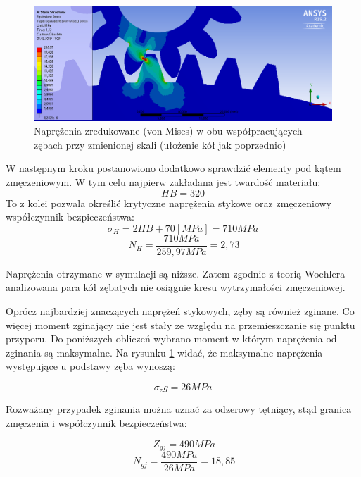 \begin{figure}[t]
	\centering
	\includegraphics[width=0.9\linewidth]{Obliczenia/von_mises_stress_przeszkalowany_przekladnia}
	\caption{Naprężenia zredukowane (von Mises) w obu współpracujących zębach przy zmienionej skali (ułożenie kół jak poprzednio)} 
	\label{fig::stress_von_mises_przeskalowany_przekladnia}
\end{figure}

W następnym kroku postanowiono dodatkowo sprawdzić elementy pod kątem zmęczeniowym.
W tym celu najpierw zakładana jest twardość materiału:
\begin{equation}
HB=320
\end{equation} 
To z kolei pozwala określić krytyczne naprężenia stykowe oraz zmęczeniowy współczynnik bezpieczeństwa:
\begin{equation}
\sigma_H = 2HB+70 [MPa]= 710MPa
\end{equation}
\begin{equation}
\ N_H=\frac{710 MPa}{259,97 MPa}=2,73
\end{equation} 

Naprężenia otrzymane w symulacji są niższe.
Zatem zgodnie z teorią Woehlera analizowana para kół zębatych nie osiągnie kresu wytrzymałości zmęczeniowej.

Oprócz najbardziej znaczących naprężeń stykowych, zęby są również zginane.
Co więcej moment zginający nie jest stały ze względu na przemieszczanie się punktu przyporu.
Do poniższych obliczeń wybrano moment w którym naprężenia od zginania są maksymalne.
Na rysunku \ref{fig::stress_von_mises_przeskalowany_przekladnia} widać, że maksymalne naprężenia występujące u podstawy zęba wynoszą:

\begin{equation}
\sigma_zg =26MPa
\end{equation}

Rozważany przypadek zginania można uznać za odzerowy tętniący, stąd granica zmęczenia i współczynnik bezpieczeństwa:

\begin{equation}
\ Z_{gj} = 490MPa
\end{equation}
\begin{equation}
\ N_{gj}=\frac{490 MPa}{26 MPa}=18,85
\end{equation} 


